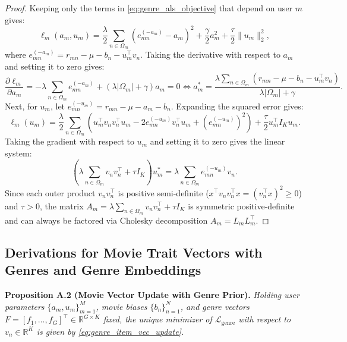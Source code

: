 \documentclass{article}
\theoremstyle{plain}
\theoremstyle{definition}
\begin{document}
\begin{proof}
Keeping only the terms in \cref{eq:genre_als_objective} that depend on user $m$ gives:
\begin{equation}
\ell_m(a_m, u_m) = \frac{\lambda}{2} \sum_{n \in \Omega_m} \left( e_{mn}^{(-a_m)} - a_m \right)^2 + \frac{\gamma}{2} a_m^2 + \frac{\tau}{2} \|u_m\|_2^2,
\end{equation}
where $e_{mn}^{(-a_m)} = r_{mn} - \mu - b_n - u_m^\top v_n$. Taking the derivative with respect to $a_m$ and setting it to zero gives:
\begin{equation}
\frac{\partial \ell_m}{\partial a_m} = -\lambda \sum_{n \in \Omega_m} e_{mn}^{(-a_m)} + \left(\lambda |\Omega_m| + \gamma\right) a_m = 0 \iff a_m^* = \frac{\lambda \sum_{n \in \Omega_m} \left(r_{mn} - \mu - b_n - u_m^\top v_n\right)}{\lambda |\Omega_m| + \gamma}.
\end{equation}
Next, for $u_m$, let $e_{mn}^{(-u_m)} = r_{mn} - \mu - a_m - b_n$. Expanding the squared error gives:
\begin{equation}
\ell_m(u_m) = \frac{\lambda}{2} \sum_{n \in \Omega_m} \left( u_m^\top v_n v_n^\top u_m - 2 e_{mn}^{(-u_m)} v_n^\top u_m + (e_{mn}^{(-u_m)})^2 \right) + \frac{\tau}{2} u_m^\top I_K u_m.
\end{equation}
Taking the gradient with respect to $u_m$ and setting it to zero gives the linear system:
\begin{equation}
\left( \lambda \sum_{n \in \Omega_m} v_n v_n^\top + \tau I_K \right) u_m^* = \lambda \sum_{n \in \Omega_m} e_{mn}^{(-u_m)} v_n.
\end{equation}
Since each outer product $v_n v_n^\top$ is positive semi-definite ($x^\top v_n v_n^\top x = (v_n^\top x)^2 \ge 0$) and $\tau > 0$, the matrix $A_m = \lambda \sum_{n \in \Omega_m} v_n v_n^\top + \tau I_K$ is symmetric positive-definite and can always be factored via Cholesky decomposition $A_m = L_m L_m^\top$.
\end{proof}

\subsection{Derivations for Movie Trait Vectors with Genres and Genre Embeddings}

\textbf{Proposition A.2 (Movie Vector Update with Genre Prior).}
\emph{Holding user parameters $\{a_m, u_m\}_{m=1}^M$, movie biases $\{b_n\}_{n=1}^N$, and genre vectors $F = [f_1, \dots, f_G]^\top \in \mathbb{R}^{G \times K}$ fixed, the unique minimizer of $\mathcal{L}_{\text{genre}}$ with respect to $v_n \in \mathbb{R}^K$ is given by \cref{eq:genre_item_vec_update}.}
\end{document}
